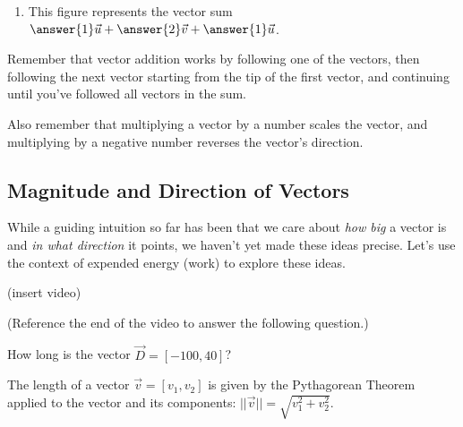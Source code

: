 \documentclass{ximera}
\begin{document}
\begin{problem}
\begin{enumerate}
        \item 
        
        This figure represents the vector sum $\answer{1}\vec{u}+\answer{2}\vec{v}+\answer{1}\vec{u}$.
    \end{enumerate}
    
    \begin{feedback}
        Remember that vector addition works by following one of the vectors, then following the next vector starting from the tip of the first vector, and continuing until you've followed all vectors in the sum. 

        Also remember that multiplying a vector by a number scales the vector, and multiplying by a negative number reverses the vector's direction.
    \end{feedback}
\end{problem}


\subsection*{Magnitude and Direction of Vectors}

While a guiding intuition so far has been that we care about \emph{how big} a vector is and \emph{in what direction} it points, we haven't yet made these ideas precise. Let's use the context of expended energy (work) to explore these ideas.

(insert video)

\begin{problem}
    (Reference the end of the video to answer the following question.)
    
    How long is the vector $\vec{D}=[-100,40]$? 

    \begin{selectAll}
    \end{selectAll}
    \begin{feedback}
        The length of a vector $\vec{v}=[v_1,v_2]$ is given by the Pythagorean Theorem applied to the vector and its components: $||\vec{v}||=\sqrt{v_1^2+v_2^2}$.
    \end{feedback}
\end{problem}
\end{document}
